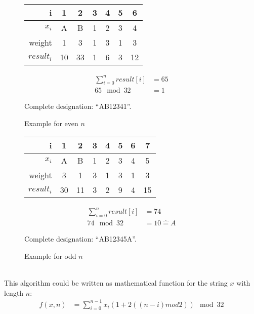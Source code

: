 \begin{minipage}[t]{.45\textwidth}
	\begin{figure}[H]
		\centering

		\begin{tabular}{r|c|c|c|c|c|c}
			i          & 1  & 2  & 3 & 4 & 5 & 6 \\
			\hline
			$x_i$      & A  & B  & 1 & 2 & 3 & 4 \\
			weight     & 1  & 3  & 1 & 3 & 1 & 3 \\
			\hline
			$result_i$ & 10 & 33 & 1 & 6 & 3 & 12 \\
		\end{tabular}

		\begin{align*}
			\sum_{i=0}^{n} result[i] &= 65 \\
			65 \mod 32 &= 1
		\end{align*}

		Complete designation: ``AB12341''.

		\caption{Example for even $n$}
	\end{figure}
\end{minipage}
\hfill
\begin{minipage}[t]{.45\textwidth}
	\begin{figure}[H]
		\centering

		\begin{tabular}{r|c|c|c|c|c|c|c}
			i          & 1  & 2  & 3 & 4 & 5 & 6 & 7 \\
			\hline
			$x_i$      & A  & B  & 1 & 2 & 3 & 4 & 5 \\
			weight     & 3  & 1  & 3 & 1 & 3 & 1 & 3 \\
			\hline
			$result_i$ & 30 & 11 & 3 & 2 & 9 & 4 & 15 \\
		\end{tabular}

		\begin{align*}
			\sum_{i=0}^{n} result[i] &= 74 \\
			74 \mod 32 &= 10 \hat{=} A
		\end{align*}

		Complete designation: ``AB12345A''.

		\caption{Example for odd $n$}
	\end{figure}
\end{minipage} \\


This algorithm could be written as mathematical function for the string $x$ with
length $n$:
\begin{align*}
	f(x, n) &= \sum_{i=0}^{n-1} x_i \left( 1 + 2 \left( \left( n - i \right) mod
		2 \right) \right) \mod 32
\end{align*}
